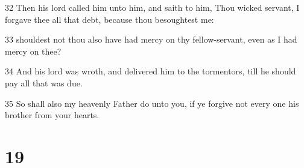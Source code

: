 \par 32 Then his lord called him unto him, and saith to him, Thou wicked servant, I forgave thee all that debt, because thou besoughtest me:
\par 33 shouldest not thou also have had mercy on thy fellow-servant, even as I had mercy on thee?
\par 34 And his lord was wroth, and delivered him to the tormentors, till he should pay all that was due.
\par 35 So shall also my heavenly Father do unto you, if ye forgive not every one his brother from your hearts.

\chapter{19}

